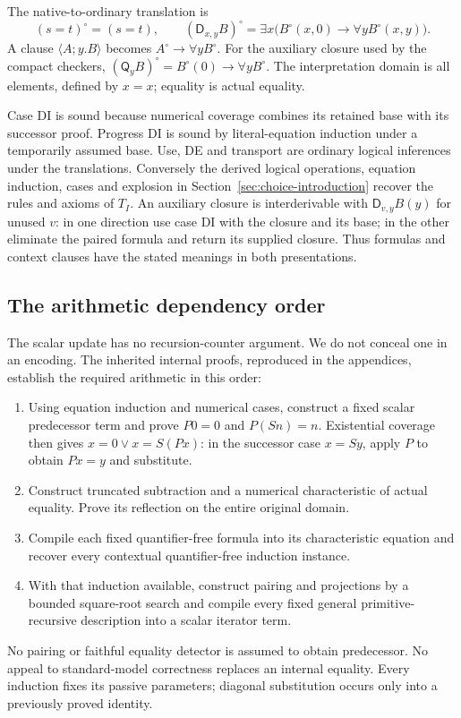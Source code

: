 \documentclass[11pt]{article}
\theoremstyle{definition}\newtheorem{definition}[theorem]{Definition}
\begin{document}
The native-to-ordinary translation is
\[
(s=t)^\circ=(s=t),\qquad
(\mathsf D_{x,y}B)^\circ=
\exists x\bigl(B^\circ(x,0)\to\forall y B^\circ(x,y)\bigr).
\]
A clause $\langle A;y.B\rangle$ becomes $A^\circ\to\forall yB^\circ$.
For the auxiliary closure used by the compact checkers,
$(\mathsf Q_yB)^\circ=B^\circ(0)\to\forall yB^\circ$.
The interpretation domain is all elements, defined by $x=x$;
equality is actual equality.

Case DI is sound because numerical coverage combines its retained base
with its successor proof. Progress DI is sound by literal-equation
induction under a temporarily assumed base. Use, DE and transport are
ordinary logical inferences under the translations. Conversely the
derived logical operations, equation induction, cases and explosion in
Section~\ref{sec:choice-introduction} recover the rules and axioms of
$T_I$. An auxiliary closure is interderivable with
$\mathsf D_{v,y}B(y)$ for unused $v$: in one direction use case DI with
the closure and its base; in the other eliminate the paired formula
and return its supplied closure. Thus formulas and context clauses have
the stated meanings in both presentations.

\subsection{The arithmetic dependency order}

The scalar update has no recursion-counter argument. We do not conceal
one in an encoding. The inherited internal proofs, reproduced in the
appendices, establish the required arithmetic in this order:
\begin{enumerate}
\item Using equation induction and numerical cases, construct a fixed
scalar predecessor term and prove $P0=0$ and $P(Sn)=n$.
Existential coverage then gives $x=0\vee x=S(Px)$: in the successor
case $x=Sy$, apply $P$ to obtain $Px=y$ and substitute.
\item Construct truncated subtraction and a numerical characteristic
of actual equality. Prove its reflection on the entire original domain.
\item Compile each fixed quantifier-free formula into its characteristic
equation and recover every contextual quantifier-free induction instance.
\item With that induction available, construct pairing and projections
by a bounded square-root search and compile every fixed general
primitive-recursive description into a scalar iterator term.
\end{enumerate}
No pairing or faithful equality detector is assumed to obtain
predecessor. No appeal to standard-model correctness replaces an
internal equality. Every induction fixes its passive parameters;
diagonal substitution occurs only into a previously proved identity.
\end{document}

